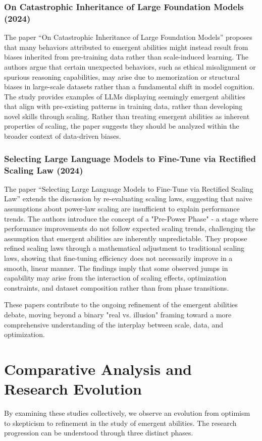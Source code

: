 \documentclass[10pt,a4paper]{article}
\begin{document}
\subsubsection{On Catastrophic Inheritance of Large Foundation Models (2024)}
The paper ``On Catastrophic Inheritance of Large Foundation Models'' \citep{catastrophic2024} proposes that many behaviors attributed to emergent abilities might instead result from biases inherited from pre-training data rather than scale-induced learning. The authors argue that certain unexpected behaviors, such as ethical misalignment or spurious reasoning capabilities, may arise due to memorization or structural biases in large-scale datasets rather than a fundamental shift in model cognition. The study provides examples of LLMs displaying seemingly emergent abilities that align with pre-existing patterns in training data, rather than developing novel skills through scaling. Rather than treating emergent abilities as inherent properties of scaling, the paper suggests they should be analyzed within the broader context of data-driven biases.

\subsubsection{Selecting Large Language Models to Fine-Tune via Rectified Scaling Law (2024)}
The paper ``Selecting Large Language Models to Fine-Tune via Rectified Scaling Law'' \citep{rectified2024} extends the discussion by re-evaluating scaling laws, suggesting that naive assumptions about power-law scaling are insufficient to explain performance trends. The authors introduce the concept of a "Pre-Power Phase" - a stage where performance improvements do not follow expected scaling trends, challenging the assumption that emergent abilities are inherently unpredictable. They propose refined scaling laws through a mathematical adjustment to traditional scaling laws, showing that fine-tuning efficiency does not necessarily improve in a smooth, linear manner. The findings imply that some observed jumps in capability may arise from the interaction of scaling effects, optimization constraints, and dataset composition rather than from phase transitions.

These papers contribute to the ongoing refinement of the emergent abilities debate, moving beyond a binary "real vs. illusion" framing toward a more comprehensive understanding of the interplay between scale, data, and optimization.

\section{Comparative Analysis and Research Evolution}
By examining these studies collectively, we observe an evolution from optimism to skepticism to refinement in the study of emergent abilities. The research progression can be understood through three distinct phases.
\end{document}
